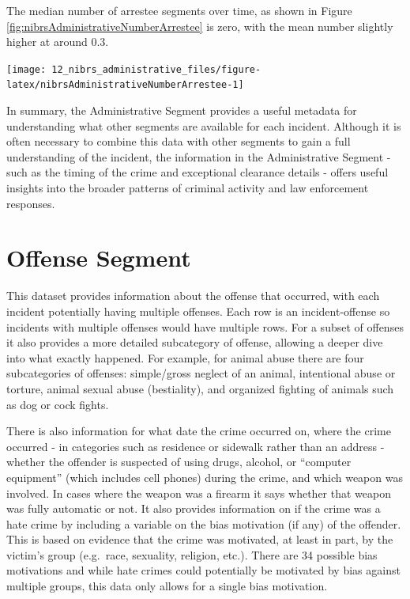 \documentclass[
]{krantz}
\let\origfigure\figure
\let\endorigfigure\endfigure
\renewenvironment{figure}[1][2] {
    \expandafter\origfigure\expandafter[H]
} {
    \endorigfigure
}
\begin{document}
The median number of arrestee segments over time, as shown
in Figure \ref{fig:nibrsAdministrativeNumberArrestee} is
zero, with the mean number slightly higher at around 0.3.

\begin{figure}

{\centering \texttt{[image: 12\_nibrs\_administrative\_files/figure-latex/nibrsAdministrativeNumberArrestee-1]} 

}

\caption{Annual mean and median number of Arrestee Segments, 1991-2023.}\label{fig:nibrsAdministrativeNumberArrestee}
\end{figure}

In summary, the Administrative Segment provides a useful
metadata for understanding what other segments are available
for each incident. Although it is often necessary to combine
this data with other segments to gain a full understanding
of the incident, the information in the Administrative
Segment - such as the timing of the crime and exceptional
clearance details - offers useful insights into the broader
patterns of criminal activity and law enforcement responses.

\chapter{Offense Segment}\label{offenseSegment}

This dataset provides information about the offense that
occurred, with each incident potentially having multiple
offenses. Each row is an incident-offense so incidents with
multiple offenses would have multiple rows. For a subset of
offenses it also provides a more detailed subcategory of
offense, allowing a deeper dive into what exactly happened.
For example, for animal abuse there are four subcategories
of offenses: simple/gross neglect of an animal, intentional
abuse or torture, animal sexual abuse (bestiality), and
organized fighting of animals such as dog or cock fights.

There is also information for what date the crime occurred
on, where the crime occurred - in categories such as
residence or sidewalk rather than an address - whether the
offender is suspected of using drugs, alcohol, or ``computer
equipment'' (which includes cell phones) during the crime,
and which weapon was involved. In cases where the weapon was
a firearm it says whether that weapon was fully automatic or
not. It also provides information on if the crime was a hate
crime by including a variable on the bias motivation (if
any) of the offender. This is based on evidence that the
crime was motivated, at least in part, by the victim's group
(e.g.~race, sexuality, religion, etc.). There are 34
possible bias motivations and while hate crimes could
potentially be motivated by bias against multiple groups,
this data only allows for a single bias motivation.
\end{document}
